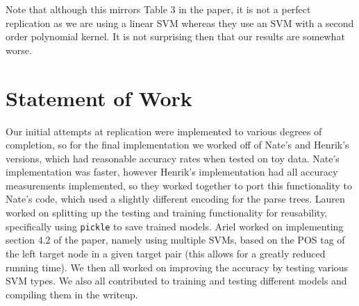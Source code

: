 \documentclass[12pt,fleqn]{article}
\begin{document}
Note that although this mirrors Table 3 in the paper, it is not a perfect replication as we are using a linear SVM whereas they use an SVM with a second order polynomial kernel. It is not surprising then that our results are somewhat worse.

    \section*{Statement of Work}
    Our initial attempts at replication were implemented to various degrees of completion, so for the final implementation we worked off of Nate's and Henrik's versions, which had reasonable accuracy rates when tested on toy data. Nate's implementation was faster, however Henrik's implementation had all accuracy measurements implemented, so they worked together to port this functionality to Nate's code, which used a slightly different encoding for the parse trees. Lauren worked on splitting up the testing and training functionality for reusability, specifically using \texttt{pickle} to save trained models. Ariel worked on implementing section 4.2 of the paper, namely using multiple SVMs, based on the POS tag of the left target node in a given target pair (this allows for a greatly reduced running time). We then all worked on improving the accuracy by testing various SVM types. We also all contributed to training and testing different models and compiling them in the writeup.
\end{document}

